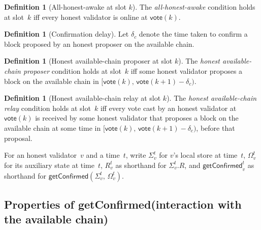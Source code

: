 \ifx\litemode\undefined\documentclass{article}\fi
\newcommand{\syncer}{\mathsf{syncer}}
\newcommand{\start}{\mathsf{start}}
\newcommand{\vote}{\mathsf{vote}}
\newcommand{\getConfirmed}{\textsf{getConfirmed}\xspace}
\theoremstyle{plain}
\newtheorem{property}[theorem]{Property}
\theoremstyle{definition}
\newtheorem{definition}[theorem]{Definition}
\theoremstyle{remark}
\newcommand{\GST}{\ensuremath{\mathsf{GST}}}
\newcommand{\HAP}{honest available-chain proposer\xspace}
\newcommand{\HAR}{honest available-chain relay\xspace}
\newcommand{\AHA}{all-honest-awake\xspace}
\begin{document}
\begin{definition}[All-honest-awake at slot $k$]\label{rev:def:all-honest-awake}
The \emph{\AHA} condition holds at slot~$k$ iff every honest validator is online at $\vote(k)$.
\end{definition}

\begin{definition}[Confirmation delay]\label{rev:def:confirmation-delay}
Let $\delta_c$ denote the time taken to confirm a block proposed by an honest proposer on the available chain.
\end{definition}

\begin{definition}[Honest available-chain proposer at slot $k$]\label{rev:def:honest-available-chain-proposer}
The \emph{\HAP} condition holds at slot~$k$ iff some honest validator proposes a block on the available chain in $[\vote(k),\, \vote(k+1) - \delta_c)$.
\end{definition}

\begin{definition}[Honest available-chain relay at slot $k$]\label{rev:def:honest-available-chain-relay}
The \emph{\HAR} condition holds at slot~$k$ iff every vote cast by an honest validator at $\vote(k)$ is received by some honest validator that proposes a block on the available chain at some time in $[\vote(k),\, \vote(k+1) - \delta_c)$, before that proposal.
\end{definition}

For an honest validator~$v$ and a time~$t$, write $\Sigma_v^t$ for $v$'s local store at time~$t$, $\Omega_v^t$ for its auxiliary state at time~$t$, $R_v^t$ as shorthand for $\Sigma_v^t.R$, and $\getConfirmed_v^t$ as shorthand for $\getConfirmed(\Sigma_v^t,\, \Omega_v^t)$.


\subsection{Properties of \getConfirmed (interaction with the available chain)}\label{rev:sec:getConfirmed-properties}
\end{document}
